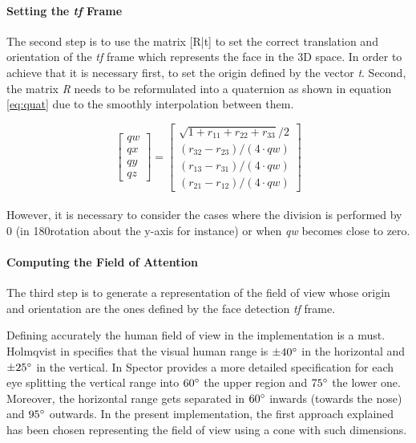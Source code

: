 \documentclass{sig-alternate}
\begin{document}
\paragraph{Setting the \textit{tf} Frame}
The second step is to use the matrix [R|t] to set the correct translation and
orientation of the \textit{tf} frame which represents the face in the 3D space.
In order to achieve that it is necessary first, to set the origin defined by the
vector \textit{t}. Second, the matrix \textit{R} needs to be reformulated into a
quaternion as shown in equation \ref{eq:quat} due to the smoothly interpolation
between them.

\begin{equation}
\begin{bmatrix}
qw \\
qx \\
qy \\
qz
\end{bmatrix}
=
\begin{bmatrix}
\sqrt{1 + r_{11} + r_{22} + r_{33}} /2 \\
(r_{32} - r_{23})/( 4 \cdot qw) \\
(r_{13} - r_{31})/( 4 \cdot qw) \\
(r_{21} - r_{12})/( 4 \cdot qw)
\end{bmatrix}
\label{eq:quat}
\end{equation}
\\
However, it is necessary to consider the cases where the division is performed
by 0 (in 180\degree rotation about the y-axis for instance) or when \textit{qw}
becomes close to zero.

\paragraph{Computing the Field of Attention}

The third step is to generate a representation of the field of view whose origin
and orientation are the ones defined by the face detection \textit{tf} frame. 

Defining accurately the human field of view in the implementation is a must.
Holmqvist in \cite{holmqvist2011eye} specifies that the visual human range is $
\pm  40\degree $ in the horizontal and $ \pm 25\degree $ in the vertical. In
\cite{walker1980clinical} Spector provides a more detailed specification for
each eye splitting the vertical range into $ 60\degree $ the upper region and $
75\degree $ the lower one. Moreover, the horizontal range gets separated in $
60\degree $ inwards (towards the nose) and $ 95\degree $ outwards. In the
present implementation, the first approach explained has been chosen
representing the field of view using a cone with such dimensions.
\end{document}
